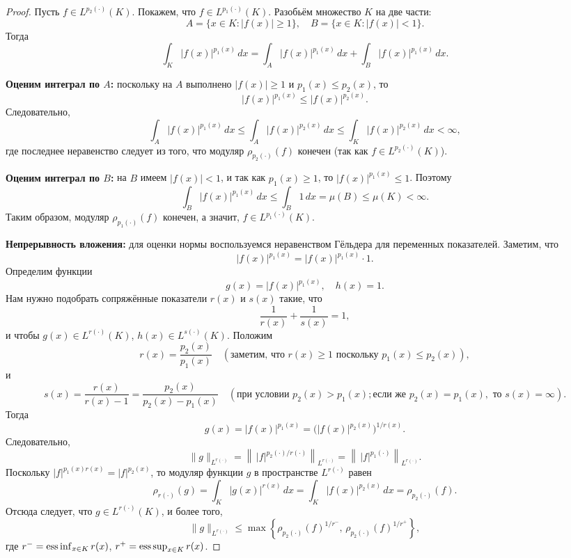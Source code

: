 \documentclass[../NDCNNAI_main.tex]{subfiles}
\begin{document}
\begin{proof}
Пусть \( f \in L^{p_2(\cdot)}(K) \). Покажем, что \( f \in L^{p_1(\cdot)}(K) \). Разобьём множество \( K \) на две части:
\[
A = \{ x \in K \colon |f(x)| \geq 1 \}, \quad B = \{ x \in K \colon |f(x)| < 1 \}.
\]
Тогда
\[
\int_K |f(x)|^{p_1(x)} \, dx = \int_A |f(x)|^{p_1(x)} \, dx + \int_B |f(x)|^{p_1(x)} \, dx.
\]

\textbf{Оценим интеграл по \( A \):} 
поскольку на \( A \) выполнено \( |f(x)| \geq 1 \) и \( p_1(x) \leq p_2(x) \), то
\[
|f(x)|^{p_1(x)} \leq |f(x)|^{p_2(x)}.
\]
Следовательно,
\[
\int_A |f(x)|^{p_1(x)} \, dx \leq \int_A |f(x)|^{p_2(x)} \, dx \leq \int_K |f(x)|^{p_2(x)} \, dx < \infty,
\]
где последнее неравенство следует из того, что модуляр \( \rho_{p_2(\cdot)}(f) \) конечен (так как \( f \in L^{p_2(\cdot)}(K) \)).

\textbf{Оценим интеграл по \( B \):} 
на \( B \) имеем \( |f(x)| < 1 \), и так как \( p_1(x) \geq 1 \), то \( |f(x)|^{p_1(x)} \leq 1 \). Поэтому
\[
\int_B |f(x)|^{p_1(x)} \, dx \leq \int_B 1 \, dx = \mu(B) \leq \mu(K) < \infty.
\]
Таким образом, модуляр \( \rho_{p_1(\cdot)}(f) \) конечен, а значит, \( f \in L^{p_1(\cdot)}(K) \).

\textbf{Непрерывность вложения:} 
для оценки нормы воспользуемся неравенством Гёльдера для переменных показателей. Заметим, что
\[
|f(x)|^{p_1(x)} = |f(x)|^{p_1(x)} \cdot 1.
\]
Определим функции
\[
g(x) = |f(x)|^{p_1(x)}, \quad h(x) = 1.
\]
Нам нужно подобрать сопряжённые показатели \( r(x) \) и \( s(x) \) такие, что
\[
\frac{1}{r(x)} + \frac{1}{s(x)} = 1,
\]
и чтобы \( g(x) \in L^{r(\cdot)}(K) \), \( h(x) \in L^{s(\cdot)}(K) \). Положим
\[
r(x) = \frac{p_2(x)}{p_1(x)} \quad (\text{заметим, что } r(x) \geq 1 \text{ поскольку } p_1(x) \leq p_2(x)),
\]
и
\[
s(x) = \frac{r(x)}{r(x)-1} = \frac{p_2(x)}{p_2(x) - p_1(x)} \quad (\text{при условии } p_2(x) > p_1(x); \text{если же } p_2(x)=p_1(x), \text{ то } s(x)=\infty).
\]
Тогда
\[
g(x) = |f(x)|^{p_1(x)} = \big( |f(x)|^{p_2(x)} \big)^{1/r(x)}.
\]
Следовательно,
\[
\| g \|_{L^{r(\cdot)}} = \left\| \, |f|^{p_2(\cdot)/r(\cdot)} \right\|_{L^{r(\cdot)}} = \left\| \, |f|^{p_1(\cdot)} \right\|_{L^{r(\cdot)}}.
\]
Поскольку \( |f|^{p_1(x) r(x)} = |f|^{p_2(x)} \), то модуляр функции \( g \) в пространстве \( L^{r(\cdot)} \) равен
\[
\rho_{r(\cdot)}(g) = \int_K |g(x)|^{r(x)} \, dx = \int_K |f(x)|^{p_2(x)} \, dx = \rho_{p_2(\cdot)}(f).
\]
Отсюда следует, что \( g \in L^{r(\cdot)}(K) \), и более того, 
\[
\| g \|_{L^{r(\cdot)}} \leq \max\left\{ \rho_{p_2(\cdot)}(f)^{1/r^-}, \, \rho_{p_2(\cdot)}(f)^{1/r^+} \right\},
\]
где \( r^- = \operatorname*{ess\,inf}_{x \in K} r(x) \), \( r^+ = \operatorname*{ess\,sup}_{x \in K} r(x) \).


\end{proof}
\end{document}
